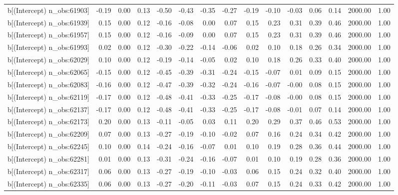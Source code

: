 \begin{table}[ht]
\begin{tabular}{rrrrrrrrrrrrrrr}
  b[(Intercept) n\_obs:61903] & -0.19 & 0.00 & 0.13 & -0.50 & -0.43 & -0.35 & -0.27 & -0.19 & -0.10 & -0.03 & 0.06 & 0.14 & 2000.00 & 1.00 \\ 
  b[(Intercept) n\_obs:61939] & 0.15 & 0.00 & 0.12 & -0.16 & -0.08 & 0.00 & 0.07 & 0.15 & 0.23 & 0.31 & 0.39 & 0.46 & 2000.00 & 1.00 \\ 
  b[(Intercept) n\_obs:61957] & 0.15 & 0.00 & 0.12 & -0.16 & -0.09 & 0.00 & 0.07 & 0.15 & 0.23 & 0.31 & 0.39 & 0.46 & 2000.00 & 1.00 \\ 
  b[(Intercept) n\_obs:61993] & 0.02 & 0.00 & 0.12 & -0.30 & -0.22 & -0.14 & -0.06 & 0.02 & 0.10 & 0.18 & 0.26 & 0.34 & 2000.00 & 1.00 \\ 
  b[(Intercept) n\_obs:62029] & 0.10 & 0.00 & 0.12 & -0.19 & -0.14 & -0.05 & 0.02 & 0.10 & 0.18 & 0.26 & 0.33 & 0.40 & 2000.00 & 1.00 \\ 
  b[(Intercept) n\_obs:62065] & -0.15 & 0.00 & 0.12 & -0.45 & -0.39 & -0.31 & -0.24 & -0.15 & -0.07 & 0.01 & 0.09 & 0.15 & 2000.00 & 1.00 \\ 
  b[(Intercept) n\_obs:62083] & -0.16 & 0.00 & 0.12 & -0.47 & -0.39 & -0.32 & -0.24 & -0.16 & -0.07 & -0.00 & 0.08 & 0.15 & 2000.00 & 1.00 \\ 
  b[(Intercept) n\_obs:62119] & -0.17 & 0.00 & 0.12 & -0.48 & -0.41 & -0.33 & -0.25 & -0.17 & -0.08 & -0.00 & 0.08 & 0.15 & 2000.00 & 1.00 \\ 
  b[(Intercept) n\_obs:62137] & -0.17 & 0.00 & 0.12 & -0.48 & -0.41 & -0.33 & -0.25 & -0.17 & -0.08 & -0.01 & 0.07 & 0.14 & 2000.00 & 1.00 \\ 
  b[(Intercept) n\_obs:62173] & 0.20 & 0.00 & 0.13 & -0.11 & -0.05 & 0.03 & 0.11 & 0.20 & 0.29 & 0.37 & 0.46 & 0.53 & 2000.00 & 1.00 \\ 
  b[(Intercept) n\_obs:62209] & 0.07 & 0.00 & 0.13 & -0.27 & -0.19 & -0.10 & -0.02 & 0.07 & 0.16 & 0.24 & 0.34 & 0.42 & 2000.00 & 1.00 \\ 
  b[(Intercept) n\_obs:62245] & 0.10 & 0.00 & 0.14 & -0.24 & -0.16 & -0.07 & 0.01 & 0.10 & 0.19 & 0.28 & 0.36 & 0.44 & 2000.00 & 1.00 \\ 
  b[(Intercept) n\_obs:62281] & 0.01 & 0.00 & 0.13 & -0.31 & -0.24 & -0.16 & -0.07 & 0.01 & 0.10 & 0.19 & 0.28 & 0.36 & 2000.00 & 1.00 \\ 
  b[(Intercept) n\_obs:62317] & 0.06 & 0.00 & 0.13 & -0.27 & -0.19 & -0.10 & -0.03 & 0.06 & 0.15 & 0.24 & 0.32 & 0.40 & 2000.00 & 1.00 \\ 
  b[(Intercept) n\_obs:62335] & 0.06 & 0.00 & 0.13 & -0.27 & -0.20 & -0.11 & -0.03 & 0.07 & 0.15 & 0.24 & 0.33 & 0.42 & 2000.00 & 1.00 \\ 

\end{tabular}
\end{table}
